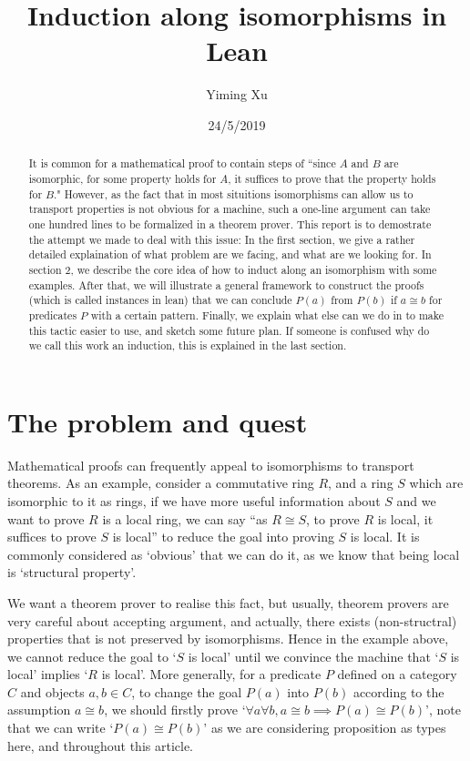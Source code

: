 \documentclass[11pt]{article}
\title{Induction along isomorphisms in Lean}
\author{Yiming Xu}
\date{24/5/2019}
\begin{document}
\maketitle
\begin{abstract}
    It is common for a mathematical proof to contain steps of ``since $A$ and $B$ are isomorphic, for some property holds for $A$, it suffices to prove that the property holds for $B$." However, as the fact that in most situitions isomorphisms can allow us to transport properties is not obvious for a machine, such a one-line argument can take one hundred lines to be formalized in a theorem prover. This report is to demostrate the attempt we made to deal with this issue: In the first section, we give a rather detailed explaination of what problem are we facing, and what are we looking for. In section 2, we describe the core idea of how to induct along an isomorphism with some examples. After that, we will illustrate a general framework to construct the proofs (which is called instances in lean) that we can conclude $P (a)$ from $P (b)$ if $a \cong b$ for predicates $P$ with a certain pattern. Finally, we explain what else can we do in to make this tactic easier to use, and sketch some future plan. If someone is confused why do we call this work an induction, this is explained in the last section.
\end{abstract}
  

\section{The problem and quest}

Mathematical proofs can frequently appeal to isomorphisms to transport theorems. As an example, consider a commutative ring $R$, and a ring $S$ which are isomorphic to it as rings, if we have more useful information about $S$ and we want to prove $R$ is a local ring, we can say ``as $R\cong S$, to prove $R$ is local, it suffices to prove $S$ is local'' to reduce the goal into proving $S$ is local. It is commonly considered as `obvious' that we can do it, as we know that being local is `structural property'. 

We want a theorem prover to realise this fact, but usually, theorem provers are very careful about accepting argument, and actually, there exists (non-structral) properties that is not preserved by isomorphisms. Hence in the example above, we cannot reduce the goal to `$S$ is local' until we convince the machine that `$S$ is local' implies `$R$ is local'. More generally, for a predicate $P$ defined on a category $C$ and objects $a,b\in C$, to change the goal $P(a)$ into $P(b)$ according to the assumption $a\cong b$, we should firstly prove `$\forall a\forall b, a \cong b \implies P(a)\cong P(b)$', note that we can write `$P(a)\cong P(b)$' as we are considering proposition as types here, and throughout this article.
\end{document}
